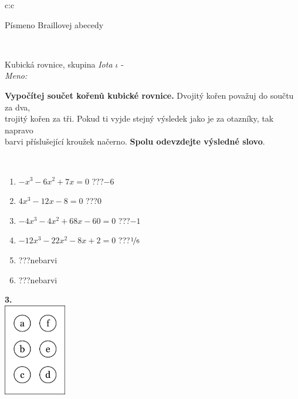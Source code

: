 \documentclass[10pt]{report}
\begin{document}
\begin{tabular}{c:c}
\begin{minipage}[c][104.5mm][t]{0.5\linewidth}
\begin{center}
\begin{minipage}{0.20\linewidth}
\begin{center}
{\small Písmeno Braillovej abecedy}
\end{center}
\end{minipage}
\end{center}
\end{minipage}
\\ \hdashline
\begin{minipage}[c][104.5mm][t]{0.5\linewidth}
\begin{center}
\vspace{7mm}
{\huge Kubická rovnice, skupina \textit{Iota $\iota$} -}\\[5mm]
\textit{Meno:}\phantom{xxxxxxxxxxxxxxxxxxxxxxxxxxxxxxxxxxxxxxxxxxxxxxxxxxxxxxxxxxxxxxxxx}\\[5mm]
\begin{minipage}{0.95\linewidth}
\textbf{Vypočítej součet kořenů kubické rovnice.} Dvojitý kořen považuj do součtu za dva,\\trojitý kořen za tři. Pokud ti vyjde stejný výsledek jako je za otazníky, tak napravo\\barvi příslušející kroužek načerno. \textbf{Spolu odevzdejte výsledné slovo}.
\end{minipage}
\\[1mm]
\begin{minipage}{0.79\linewidth}
\begin{center}
\begin{varwidth}{\linewidth}
\begin{enumerate}
\Large
\item $-x^3-6x^2+7x=0$\quad \dotfill\; ???\;\dotfill \quad $-6$
\item $4x^3-12x-8=0$\quad \dotfill\; ???\;\dotfill \quad $0$
\item $-4x^3-4x^2+68x-60=0$\quad \dotfill\; ???\;\dotfill \quad $-1$
\item $-12x^3-22x^2-8x+2=0$\quad \dotfill\; ???\;\dotfill \quad $\nicefrac{1}{6}$
\item \quad \dotfill\; ???\;\dotfill \quad nebarvi
\item \quad \dotfill\; ???\;\dotfill \quad nebarvi
\end{enumerate}
\end{varwidth}
\end{center}
\end{minipage}
\begin{minipage}{0.20\linewidth}
\begin{center}
{\Huge\bfseries 3.} \\[2mm]
\includegraphics[height=40mm]{../images/braille.png}

\end{center}
\end{minipage}
\end{center}
\end{minipage}
\end{tabular}
\end{document}

